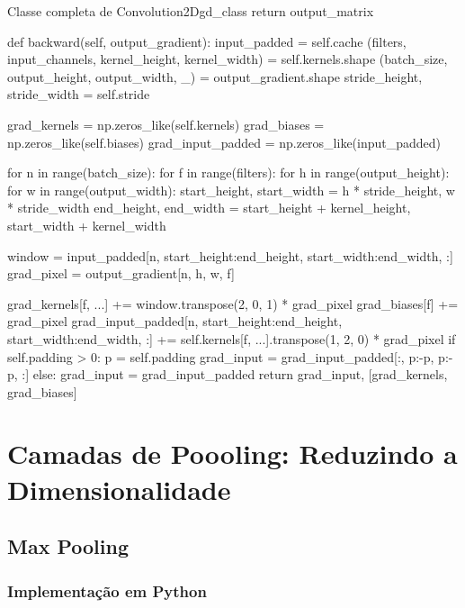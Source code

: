 \begin{codelisting}{Classe completa de Convolution2D}{gd_class}
        return output_matrix

    def backward(self, output_gradient):
        input_padded = self.cache
        (filters, input_channels, kernel_height, kernel_width) = self.kernels.shape
        (batch_size, output_height, output_width, _) = output_gradient.shape
        stride_height, stride_width = self.stride

        grad_kernels = np.zeros_like(self.kernels)
        grad_biases = np.zeros_like(self.biases)
        grad_input_padded = np.zeros_like(input_padded)

        for n in range(batch_size):
            for f in range(filters):
                for h in range(output_height):
                    for w in range(output_width):
                        start_height, start_width = h * stride_height, w * stride_width
                        end_height, end_width = start_height + kernel_height, start_width + kernel_width

                        window = input_padded[n, start_height:end_height, start_width:end_width, :]
                        grad_pixel = output_gradient[n, h, w, f]

                        grad_kernels[f, ...] += window.transpose(2, 0, 1) * grad_pixel
                        grad_biases[f] += grad_pixel
                        grad_input_padded[n, start_height:end_height, start_width:end_width, :] += self.kernels[f, ...].transpose(1, 2,
                                                                                                             0) * grad_pixel
        if self.padding > 0:
            p = self.padding
            grad_input = grad_input_padded[:, p:-p, p:-p, :]
        else:
            grad_input = grad_input_padded
        return grad_input, [grad_kernels, grad_biases]


\end{codelisting}

\section{Camadas de Poooling: Reduzindo a Dimensionalidade}

\subsection{Max Pooling}

\subsubsection{Implementação em Python}

